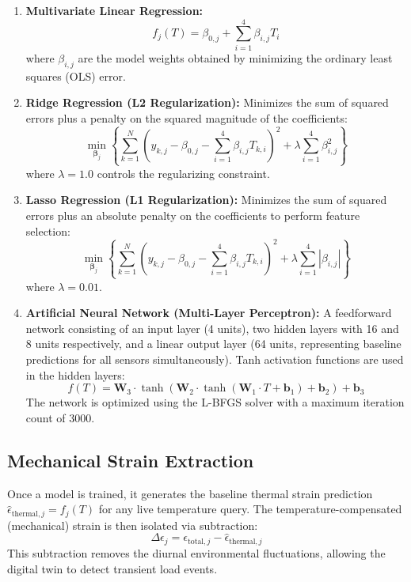 \documentclass[11pt,journal,onecolumn]{IEEEtran}
\begin{document}
\begin{enumerate}
    \item \textbf{Multivariate Linear Regression:}
    \begin{equation}
        f_j(T) = \beta_{0, j} + \sum_{i=1}^4 \beta_{i, j} T_i
    \end{equation}
    where $\beta_{i, j}$ are the model weights obtained by minimizing the ordinary least squares (OLS) error.
    \item \textbf{Ridge Regression (L2 Regularization):}
    Minimizes the sum of squared errors plus a penalty on the squared magnitude of the coefficients:
    \begin{equation}
        \min_{\boldsymbol{\beta}_j} \left\{ \sum_{k=1}^N \left( y_{k, j} - \beta_{0, j} - \sum_{i=1}^4 \beta_{i, j} T_{k, i} \right)^2 + \lambda \sum_{i=1}^4 \beta_{i, j}^2 \right\}
    \end{equation}
    where $\lambda = 1.0$ controls the regularizing constraint.
    \item \textbf{Lasso Regression (L1 Regularization):}
    Minimizes the sum of squared errors plus an absolute penalty on the coefficients to perform feature selection:
    \begin{equation}
        \min_{\boldsymbol{\beta}_j} \left\{ \sum_{k=1}^N \left( y_{k, j} - \beta_{0, j} - \sum_{i=1}^4 \beta_{i, j} T_{k, i} \right)^2 + \lambda \sum_{i=1}^4 |\beta_{i, j}| \right\}
    \end{equation}
    where $\lambda = 0.01$.
    \item \textbf{Artificial Neural Network (Multi-Layer Perceptron):}
    A feedforward network consisting of an input layer (4 units), two hidden layers with 16 and 8 units respectively, and a linear output layer (64 units, representing baseline predictions for all sensors simultaneously). Tanh activation functions are used in the hidden layers:
    \begin{equation}
        f(T) = \mathbf{W}_3 \cdot \tanh\left(\mathbf{W}_2 \cdot \tanh\left(\mathbf{W}_1 \cdot T + \mathbf{b}_1\right) + \mathbf{b}_2\right) + \mathbf{b}_3
    \end{equation}
    The network is optimized using the L-BFGS solver with a maximum iteration count of 3000.
\end{enumerate}

\subsection{Mechanical Strain Extraction}
Once a model is trained, it generates the baseline thermal strain prediction $\hat{\epsilon}_{\text{thermal}, j} = f_j(T)$ for any live temperature query. The temperature-compensated (mechanical) strain is then isolated via subtraction:
\begin{equation}
    \Delta\epsilon_j = \epsilon_{\text{total}, j} - \hat{\epsilon}_{\text{thermal}, j}
\end{equation}
This subtraction removes the diurnal environmental fluctuations, allowing the digital twin to detect transient load events.
\end{document}
